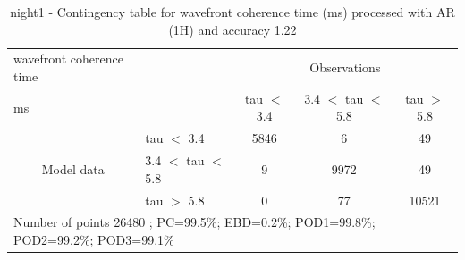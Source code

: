 \begin{table}[p!]
\begin{center}
\begin{tabular}{llccc}
\hline
{wavefront coherence time}                                       &                                                    & \multicolumn{3}{c}{Observations}                 \\
{ms}                                       &                             & tau $<$ 3.4   & 3.4 $<$ tau $<$ 5.8 & tau $>$ 5.8 \\
\hline
\multicolumn{1}{c}{\multirow{3}{*}{Model data}}  & tau $<$ 3.4             & 5846                & 6                       & 49              \\
                                                 & 3.4  $<$ tau $<$ 5.8 & 9                & 9972                       & 49              \\
                                                 & tau $>$ 5.8             & 0                & 77                       & 10521              \\
\hline
\multicolumn{5}{l}{ Number of points        26480 ; PC=99.5\%; EBD=0.2\%; POD1=99.8\%; POD2=99.2\%; POD3=99.1\%}
\end{tabular}
\end{center}
\caption{night1 - Contingency table for  wavefront coherence time (ms) processed with AR (1H) and accuracy 1.22}
\label{tab:contingencytauAFT:night1}
\end{table}
